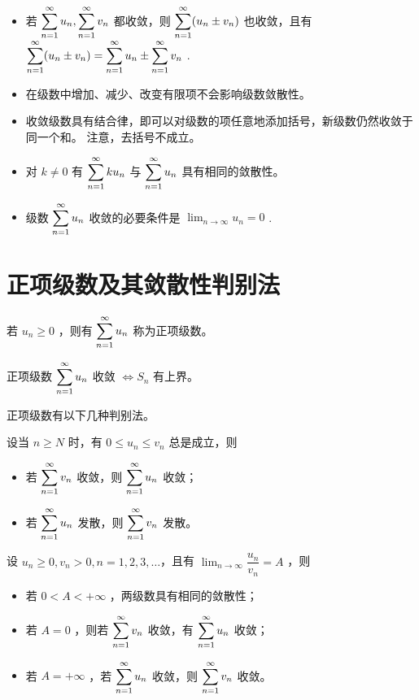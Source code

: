 \begin{itemize}
    \item 若 $ \displaystyle \sum_{n=1}^{\infty}u_n,\sum_{n=1}^{\infty}v_n $ 都收敛，则
    $ \displaystyle \sum_{n = 1}^{\infty}(u_n\pm v_n) $ 也收敛，且有
    $ \displaystyle \sum_{n = 1}^{\infty}(u_n\pm v_n) = \sum_{n=1}^{\infty}u_n\pm\sum_{n=1}^{\infty}v_n $ .
    \item 在级数中增加、减少、改变有限项不会影响级数敛散性。
    \item 收敛级数具有结合律，即可以对级数的项任意地添加括号，新级数仍然收敛于同一个和。
    注意，去括号不成立。
    \item 对 $ k \neq 0 $ 有 $ \displaystyle \sum_{n=1}^{\infty}ku_n $ 与  $ \displaystyle \sum_{n=1}^{\infty}u_n $
    具有相同的敛散性。
    \item 级数  $ \displaystyle \sum_{n=1}^{\infty}u_n $ 收敛的必要条件是 $ {\displaystyle\lim_{n\rightarrow \infty}}u_n = 0 $ .
\end{itemize}

\section{正项级数及其敛散性判别法}

\begin{Def}[正项级数]

    若 $ u_n\geq 0 $ ，则有 $\displaystyle \sum_{n=1}^{\infty}u_n $ 称为正项级数。
\end{Def}

\begin{Theo}[正项级数收敛基本定理]

    正项级数 $\displaystyle \sum_{n=1}^{\infty}u_n $ 收敛 $ \Leftrightarrow  S_n $ 有上界。
\end{Theo}

正项级数有以下几种判别法。

\begin{Theo}[直接比较法]

    设当 $ n\geq N $ 时，有 $ 0\leq u_n\leq v_n $ 总是成立，则\begin{itemize}
        \item 若 $\displaystyle \sum_{n=1}^{\infty}v_n $ 收敛，则 $\displaystyle \sum_{n=1}^{\infty}u_n $ 收敛；
        \item 若 $\displaystyle \sum_{n=1}^{\infty}u_n $ 发散，则 $\displaystyle \sum_{n=1}^{\infty}v_n $ 发散。
    \end{itemize}
\end{Theo}

\begin{Theo}[间接比较法]

    设 $ u_n\geq 0, v_n>0,n = 1,2,3,\dots $，且有 $ {\displaystyle\lim_{n\rightarrow \infty}}
    \dfrac{u_n}{v_n} = A  $ ，则\begin{itemize}
        \item 若 $ 0<A<+\infty $ ，两级数具有相同的敛散性；
        \item 若 $ A = 0 $ ，则若 $\displaystyle \sum_{n=1}^{\infty}v_n $ 收敛，有 $\displaystyle \sum_{n=1}^{\infty}u_n $ 收敛；
        \item 若 $ A = +\infty $ ，若 $\displaystyle \sum_{n=1}^{\infty}u_n $ 收敛，则 $\displaystyle \sum_{n=1}^{\infty}v_n $ 收敛。
    \end{itemize}
\end{Theo}

